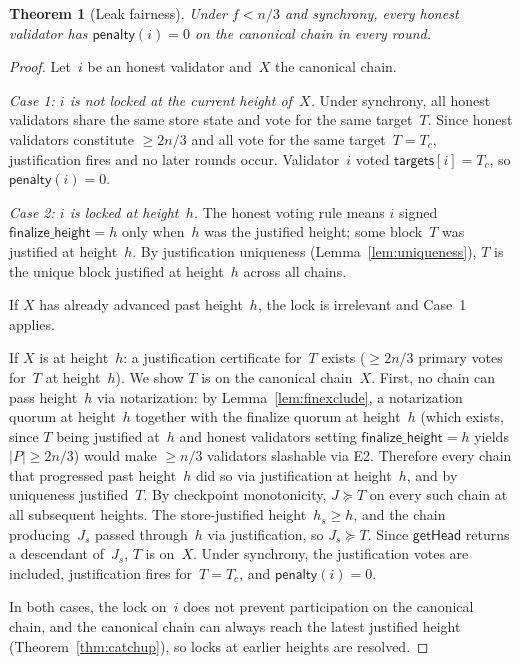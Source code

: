 \ifx\litemode\undefined\documentclass{article}\fi
\theoremstyle{plain}
\newtheorem{theorem}{Theorem}
\theoremstyle{definition}
\theoremstyle{remark}
\begin{document}
\begin{theorem}[Leak fairness]\label{thm:fairness}
Under $f < n/3$ and synchrony, every honest validator has $\mathsf{penalty}(i) = 0$ on the canonical chain in every round.
\end{theorem}

\begin{proof}
Let~$i$ be an honest validator and~$X$ the canonical chain.

\emph{Case 1: $i$ is not locked at the current height of~$X$.}
Under synchrony, all honest validators share the same store state and vote for the same target~$T$.
Since honest validators constitute $\geq 2n/3$ and all vote for the same target~$T = T_c$, justification fires and no later rounds occur.
Validator~$i$ voted $\mathsf{targets}[i] = T_c$, so $\mathsf{penalty}(i) = 0$.

\emph{Case 2: $i$ is locked at height~$h$.}
The honest voting rule means $i$ signed $\mathsf{finalize\_height} = h$ only when~$h$ was the justified height; some block~$T$ was justified at height~$h$.
By justification uniqueness (Lemma~\ref{lem:uniqueness}), $T$ is the unique block justified at height~$h$ across all chains.

If $X$ has already advanced past height~$h$, the lock is irrelevant and Case~1 applies.

If $X$ is at height~$h$: a justification certificate for~$T$ exists ($\geq 2n/3$ primary votes for~$T$ at height~$h$).
We show $T$ is on the canonical chain~$X$.
First, no chain can pass height~$h$ via notarization: by Lemma~\ref{lem:finexclude}, a notarization quorum at height~$h$ together with the finalize quorum at height~$h$ (which exists, since $T$ being justified at~$h$ and honest validators setting $\mathsf{finalize\_height} = h$ yields $|P| \geq 2n/3$) would make $\geq n/3$ validators slashable via E2.
Therefore every chain that progressed past height~$h$ did so via justification at height~$h$, and by uniqueness justified~$T$.
By checkpoint monotonicity, $J \succeq T$ on every such chain at all subsequent heights.
The store-justified height~$h_s \geq h$, and the chain producing~$J_s$ passed through~$h$ via justification, so $J_s \succeq T$.
Since $\textsf{getHead}$ returns a descendant of~$J_s$, $T$ is on~$X$.
Under synchrony, the justification votes are included, justification fires for~$T = T_c$, and $\mathsf{penalty}(i) = 0$.

In both cases, the lock on~$i$ does not prevent participation on the canonical chain, and the canonical chain can always reach the latest justified height (Theorem~\ref{thm:catchup}), so locks at earlier heights are resolved.
\end{proof}
\end{document}
